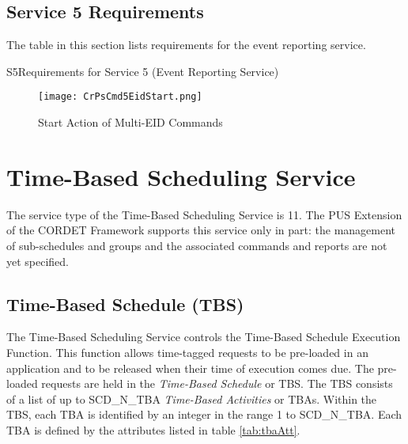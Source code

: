 \documentclass{pnp_article}
\begin{document}


\newpage
\subsection{Service 5 Requirements}
The table in this section lists requirements for the event reporting service.

\begin{crReq}{S5}{Requirements for Service 5 (Event Reporting Service)}
\end{crReq}

\begin{figure}[H]
 \centering
 \texttt{[image: CrPsCmd5EidStart.png]}
 \caption{Start Action of Multi-EID Commands}
 \label{fig:Cmd5EidStart}
\end{figure}


\section{Time-Based Scheduling Service}\label{sec:serv11}
The service type of the Time-Based Scheduling Service is 11. The PUS Extension of the CORDET Framework supports this service only in part: the management of sub-schedules and groups and the associated commands and reports are not yet specified. 

\subsection{Time-Based Schedule (TBS)}
The Time-Based Scheduling Service controls the Time-Based Schedule Execution Function. This function allows time-tagged requests to be pre-loaded in an application and to be released when their time of execution comes due. The pre-loaded requests are held in the \textit{Time-Based Schedule} or TBS. The TBS consists of a list of up to SCD\_N\_TBA \textit{Time-Based Activities} or TBAs. Within the TBS, each TBA is identified by an integer in the range 1 to SCD\_N\_TBA. Each TBA is defined by the attributes listed in table \ref{tab:tbaAtt}. 
\end{document}
